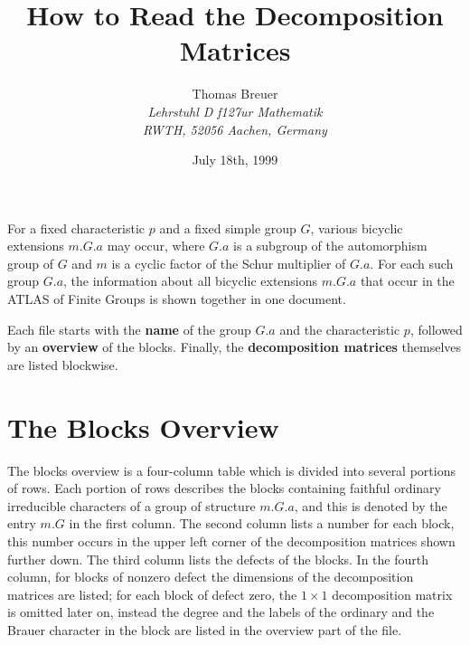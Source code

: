 \documentclass[a4paper]{article}
\def\ATLAS{{\sf ATLAS}}
\begin{document}
\title{How to Read the Decomposition Matrices}

\author{{\sc Thomas Breuer} \\[0.5cm]
{\it Lehrstuhl D f\accent127ur Mathematik} \\
{\it RWTH, 52056 Aachen, Germany}}

\date{July 18th, 1999}


\maketitle

For a fixed characteristic $p$ and a fixed simple group $G$,
various bicyclic extensions $m.G.a$ may occur,
where $G.a$ is a subgroup of the automorphism group of $G$
and $m$ is a cyclic factor of the Schur multiplier of $G.a$.
For each such group $G.a$, the information about all bicyclic extensions
$m.G.a$ that occur in the {\ATLAS} of Finite Groups is shown together
in one document.


Each file starts with the {\bf name} of the group $G.a$ and the
characteristic $p$,
followed by an {\bf overview} of the blocks.
Finally, the {\bf decomposition matrices} themselves are listed blockwise.


\section{The Blocks Overview}

The blocks overview is a four-column table which is divided into several
portions of rows.
Each portion of rows describes the blocks containing faithful
ordinary irreducible characters of a group of structure $m.G.a$,
and this is denoted by the entry $m.G$ in the first column.
The second column lists a number for each block,
this number occurs in the upper left corner of the decomposition matrices
shown further down.
The third column lists the defects of the blocks.
In the fourth column, for blocks of nonzero defect the dimensions of the
decomposition matrices are listed;
for each block of defect zero, the $1 \times 1$ decomposition matrix
is omitted later on,
instead the degree and the labels of the ordinary and the Brauer
character in the block are listed in the overview part of the file.
\end{document}
